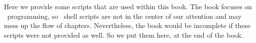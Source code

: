 %
%
Here we provide some scripts that are used within this book.
The book focuses on \python\ programming, so \bash\ shell scripts are not in the center of our attention and may mess up the flow of chapters.
Nevertheless, the book would be incomplete if these scripts were not provided as well.
So we put them here, at the end of the book.%
%
%
%
\endhsection%
%
